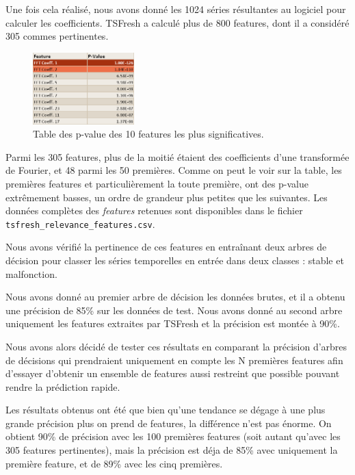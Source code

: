 \documentclass[french]{article}
\theoremstyle{mytheoremstyle}
\theoremstyle{mytheoremstyle}
\theoremstyle{myproblemstyle}
\begin{document}
        Une fois cela réalisé, nous avons donné les 1024 séries résultantes au logiciel pour calculer les coefficients. TSFresh a calculé plus de 800 features, dont il a considéré 305 commes pertinentes.
        
\begin{figure}[H]
            \centering
            \includegraphics[width=0.35\textwidth]{images/features_pvalue.png}
            \caption{Table des p-value des 10 features les plus significatives.}
            \label{}
        \end{figure}

        Parmi les 305 features, plus de la moitié étaient des coefficients d'une transformée de Fourier, et 48 parmi les 50 premières. Comme on peut le voir sur la table, les premières features et particulièrement la toute première, ont des p-value extrêmement basses, un ordre de grandeur plus petites que les suivantes. Les données complètes des \emph{features} retenues sont disponibles dans le fichier \texttt{tsfresh\_relevance\_features.csv}.
        
        Nous avons vérifié la pertinence de ces features en entraînant deux arbres de décision pour classer les séries temporelles en entrée dans deux classes : stable et malfonction.
        
        Nous avons donné au premier arbre de décision les données brutes, et il a obtenu une précision de 85\% sur les données de test. Nous avons donné au second arbre uniquement les features extraites par TSFresh et la précision est montée à 90\%.
        
        Nous avons alors décidé de tester ces résultats en comparant la précision d'arbres de décisions qui prendraient uniquement en compte les N premières features afin d'essayer d'obtenir un ensemble de features aussi restreint que possible pouvant rendre la prédiction rapide. 
        
        Les résultats obtenus ont été que bien qu'une tendance se dégage à une plus grande précision plus on prend de features, la différence n'est pas énorme. On obtient 90\% de précision avec les 100 premières features (soit autant qu'avec les 305 features pertinentes), mais la précision est déja de 85\% avec uniquement la première feature, et de  89\% avec les cinq premières.
        
\end{document}
